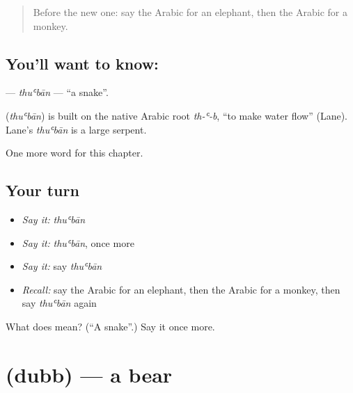 \label{lesson:AR-C80-thuban}



\begin{quote}
Before the new one: say the Arabic for an elephant, then the Arabic for a monkey.
\end{quote}

\subsection*{You'll want to know: }
\textbf{} — \emph{thuʿbān} — \textquotedblleft{}a snake\textquotedblright{}.

\begin{cousinweb}
\textbf{} (\emph{thuʿbān}) is built on the native Arabic root \emph{th-ʿ-b}, \textquotedblleft{}to make water flow\textquotedblright{} (Lane). Lane's \emph{thuʿbān} is a large serpent.
\end{cousinweb}

\begin{grammarlens}[title={What you've built}]
One more word for this chapter.
\end{grammarlens}

\subsection*{Your turn}
\begin{itemize}
\raggedright
  \item \emph{Say it:} \emph{thuʿbān}
  \item \emph{Say it:} \emph{thuʿbān}, once more
  \item \emph{Say it:} say \emph{thuʿbān}
  \item \emph{Recall:} say the Arabic for an elephant, then the Arabic for a monkey, then say \emph{thuʿbān} again
\end{itemize}

\begin{tcolorbox}[breakable,colback=teal!4,colframe=teal!35!black,title={Before you move on}]
What does  mean? (\textquotedblleft{}A snake\textquotedblright{}.) Say it once more.
\end{tcolorbox}
\section[\texorpdfstring{\ar{دب} (dubb)}{دب (dubb)}]{ (dubb) — a bear}

\label{lesson:AR-C80-dubb}



